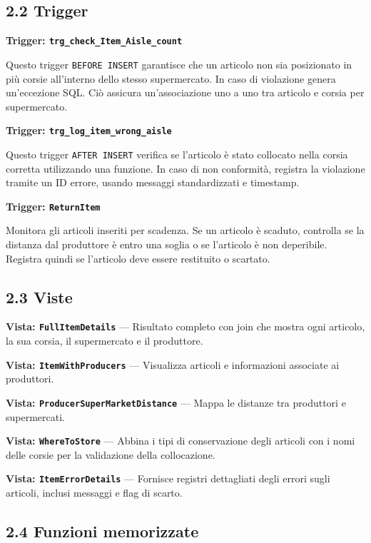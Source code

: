 \documentclass[a4paper,12pt]{article}
\begin{document}
\subsection*{2.2 Trigger}

\textbf{Trigger: \texttt{trg\_check\_Item\_Aisle\_count}}

Questo trigger \texttt{BEFORE INSERT} garantisce che un articolo non sia posizionato in più corsie all’interno dello stesso supermercato. In caso di violazione genera un’eccezione SQL. Ciò assicura un’associazione uno a uno tra articolo e corsia per supermercato.

\textbf{Trigger: \texttt{trg\_log\_item\_wrong\_aisle}}

Questo trigger \texttt{AFTER INSERT} verifica se l’articolo è stato collocato nella corsia corretta utilizzando una funzione. In caso di non conformità, registra la violazione tramite un ID errore, usando messaggi standardizzati e timestamp.

\textbf{Trigger: \texttt{ReturnItem}}

Monitora gli articoli inseriti per scadenza. Se un articolo è scaduto, controlla se la distanza dal produttore è entro una soglia o se l’articolo è non deperibile. Registra quindi se l’articolo deve essere restituito o scartato.

\subsection*{2.3 Viste}

\textbf{Vista: \texttt{FullItemDetails}} — Risultato completo con join che mostra ogni articolo, la sua corsia, il supermercato e il produttore.

\textbf{Vista: \texttt{ItemWithProducers}} — Visualizza articoli e informazioni associate ai produttori.

\textbf{Vista: \texttt{ProducerSuperMarketDistance}} — Mappa le distanze tra produttori e supermercati.

\textbf{Vista: \texttt{WhereToStore}} — Abbina i tipi di conservazione degli articoli con i nomi delle corsie per la validazione della collocazione.

\textbf{Vista: \texttt{ItemErrorDetails}} — Fornisce registri dettagliati degli errori sugli articoli, inclusi messaggi e flag di scarto.

\subsection*{2.4 Funzioni memorizzate}
\end{document}
